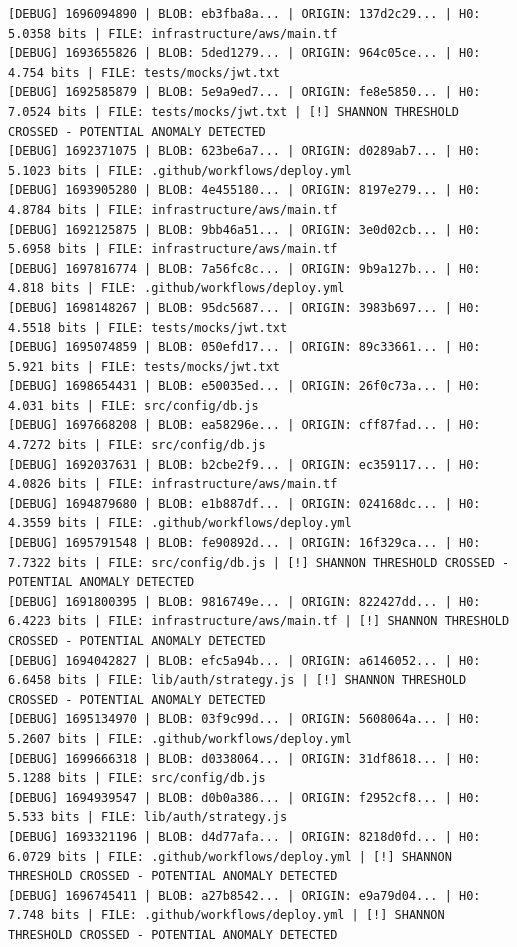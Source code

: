 \documentclass[12pt, a4paper, oneside]{report}
\begin{document}
\begin{lstlisting}[basicstyle=\tiny\ttfamily]
[DEBUG] 1696094890 | BLOB: eb3fba8a... | ORIGIN: 137d2c29... | H0: 5.0358 bits | FILE: infrastructure/aws/main.tf
[DEBUG] 1693655826 | BLOB: 5ded1279... | ORIGIN: 964c05ce... | H0: 4.754 bits | FILE: tests/mocks/jwt.txt
[DEBUG] 1692585879 | BLOB: 5e9a9ed7... | ORIGIN: fe8e5850... | H0: 7.0524 bits | FILE: tests/mocks/jwt.txt | [!] SHANNON THRESHOLD CROSSED - POTENTIAL ANOMALY DETECTED
[DEBUG] 1692371075 | BLOB: 623be6a7... | ORIGIN: d0289ab7... | H0: 5.1023 bits | FILE: .github/workflows/deploy.yml
[DEBUG] 1693905280 | BLOB: 4e455180... | ORIGIN: 8197e279... | H0: 4.8784 bits | FILE: infrastructure/aws/main.tf
[DEBUG] 1692125875 | BLOB: 9bb46a51... | ORIGIN: 3e0d02cb... | H0: 5.6958 bits | FILE: infrastructure/aws/main.tf
[DEBUG] 1697816774 | BLOB: 7a56fc8c... | ORIGIN: 9b9a127b... | H0: 4.818 bits | FILE: .github/workflows/deploy.yml
[DEBUG] 1698148267 | BLOB: 95dc5687... | ORIGIN: 3983b697... | H0: 4.5518 bits | FILE: tests/mocks/jwt.txt
[DEBUG] 1695074859 | BLOB: 050efd17... | ORIGIN: 89c33661... | H0: 5.921 bits | FILE: tests/mocks/jwt.txt
[DEBUG] 1698654431 | BLOB: e50035ed... | ORIGIN: 26f0c73a... | H0: 4.031 bits | FILE: src/config/db.js
[DEBUG] 1697668208 | BLOB: ea58296e... | ORIGIN: cff87fad... | H0: 4.7272 bits | FILE: src/config/db.js
[DEBUG] 1692037631 | BLOB: b2cbe2f9... | ORIGIN: ec359117... | H0: 4.0826 bits | FILE: infrastructure/aws/main.tf
[DEBUG] 1694879680 | BLOB: e1b887df... | ORIGIN: 024168dc... | H0: 4.3559 bits | FILE: .github/workflows/deploy.yml
[DEBUG] 1695791548 | BLOB: fe90892d... | ORIGIN: 16f329ca... | H0: 7.7322 bits | FILE: src/config/db.js | [!] SHANNON THRESHOLD CROSSED - POTENTIAL ANOMALY DETECTED
[DEBUG] 1691800395 | BLOB: 9816749e... | ORIGIN: 822427dd... | H0: 6.4223 bits | FILE: infrastructure/aws/main.tf | [!] SHANNON THRESHOLD CROSSED - POTENTIAL ANOMALY DETECTED
[DEBUG] 1694042827 | BLOB: efc5a94b... | ORIGIN: a6146052... | H0: 6.6458 bits | FILE: lib/auth/strategy.js | [!] SHANNON THRESHOLD CROSSED - POTENTIAL ANOMALY DETECTED
[DEBUG] 1695134970 | BLOB: 03f9c99d... | ORIGIN: 5608064a... | H0: 5.2607 bits | FILE: .github/workflows/deploy.yml
[DEBUG] 1699666318 | BLOB: d0338064... | ORIGIN: 31df8618... | H0: 5.1288 bits | FILE: src/config/db.js
[DEBUG] 1694939547 | BLOB: d0b0a386... | ORIGIN: f2952cf8... | H0: 5.533 bits | FILE: lib/auth/strategy.js
[DEBUG] 1693321196 | BLOB: d4d77afa... | ORIGIN: 8218d0fd... | H0: 6.0729 bits | FILE: .github/workflows/deploy.yml | [!] SHANNON THRESHOLD CROSSED - POTENTIAL ANOMALY DETECTED
[DEBUG] 1696745411 | BLOB: a27b8542... | ORIGIN: e9a79d04... | H0: 7.748 bits | FILE: .github/workflows/deploy.yml | [!] SHANNON THRESHOLD CROSSED - POTENTIAL ANOMALY DETECTED

\end{lstlisting}
\end{document}
